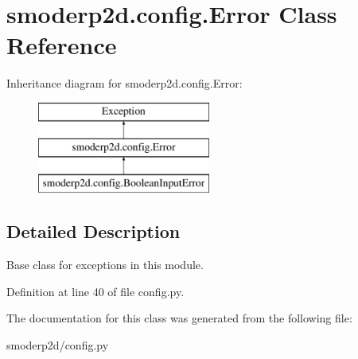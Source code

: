 \hypertarget{classsmoderp2d_1_1config_1_1Error}{\section{smoderp2d.\-config.\-Error Class Reference}
\label{classsmoderp2d_1_1config_1_1Error}
}
Inheritance diagram for smoderp2d.\-config.\-Error\-:\begin{figure}[H]
\begin{center}
\leavevmode
\includegraphics[height=3.000000cm]{de/dd2/classsmoderp2d_1_1config_1_1Error}
\end{center}
\end{figure}


\subsection{Detailed Description}
\begin{DoxyVerb}Base class for exceptions in this module.\end{DoxyVerb}
 

Definition at line 40 of file config.\-py.



The documentation for this class was generated from the following file\-:\begin{DoxyCompactItemize}
\item 
smoderp2d/config.\-py\end{DoxyCompactItemize}
